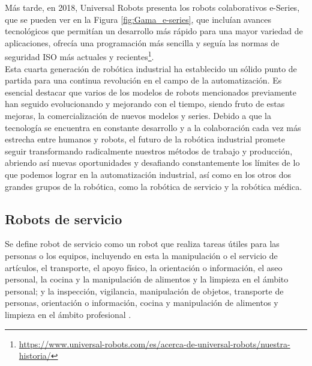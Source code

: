 Más tarde, en 2018, Universal Robots presenta los robots colaborativos e-Series, que se pueden ver en la Figura \ref{fig:Gama_e-series}, que incluían avances tecnológicos que permitían un desarrollo más rápido para una mayor variedad de aplicaciones, ofrecía una programación más sencilla y seguía las normas de seguridad ISO más actuales y recientes\footnote{\url{https://www.universal-robots.com/es/acerca-de-universal-robots/nuestra-historia/}}.\\
 

Esta cuarta generación de robótica industrial ha establecido un sólido punto de partida para una continua revolución en el campo de la automatización. 
Es esencial destacar que varios de los modelos de robots mencionados previamente han seguido evolucionando y mejorando con el tiempo, siendo fruto de estas mejoras, la comercialización de nuevos modelos y series. 
Debido a que la tecnología se encuentra en constante desarrollo y a la colaboración cada vez más estrecha entre humanos y robots, el futuro de la robótica industrial promete seguir transformando radicalmente nuestros métodos de trabajo y producción, abriendo así nuevas oportunidades y desafiando constantemente los límites de lo que podemos lograr en la automatización industrial, así como en los otros dos grandes grupos de la robótica, como la robótica de servicio y la robótica médica.
   
\subsection{Robots de servicio}
\label{sec:robot_servicio}

Se define robot de servicio como un robot que realiza tareas útiles para las personas o los equipos, incluyendo en esta la manipulación o el servicio de artículos, el transporte, el apoyo físico, la orientación o información, el aseo personal, la cocina y la manipulación de alimentos y la limpieza en el ámbito personal; y la inspección, vigilancia, manipulación de objetos, transporte de personas, orientación o información, cocina y manipulación de alimentos y limpieza en el ámbito profesional \cite{ISO8373}.\\

